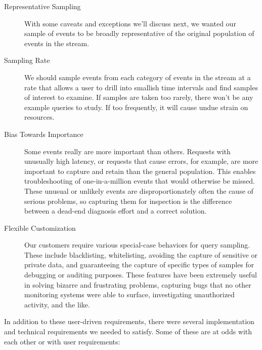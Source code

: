 \documentclass{vivid_layout}
\begin{document}
\begin{description}

\item[Representative Sampling] With some caveats and exceptions we'll discuss
next, we wanted our sample of events to be broadly representative of the
original population of events in the stream.

\item[Sampling Rate] We should sample events from each category of events in the
stream at a rate that allows a user to drill into smallish time intervals and
find samples of interest to examine. If samples are taken too rarely, there
won't be any example queries to study. If too frequently, it will cause undue
strain on resources.

\item[Bias Towards Importance] Some events really are more important than
others. Requests with unusually high latency, or requests that cause errors, for
example, are more important to capture and retain than the general population.
This enables troubleshooting of one-in-a-million events that would otherwise be
missed. These unusual or unlikely events are disproportionately often the cause
of serious problems, so capturing them for inspection is the difference between
a dead-end diagnosis effort and a correct solution.

\item[Flexible Customization] Our customers require various special-case
behaviors for query sampling. These include blacklisting, whitelisting, avoiding
the capture of sensitive or private data, and guaranteeing the capture of
specific types of samples for debugging or auditing purposes. These features
have been extremely useful in solving bizarre and frustrating problems,
capturing bugs that no other monitoring systems were able to surface,
investigating unauthorized activity, and the like.

\end{description}

In addition to these user-driven requirements, there were several implementation
and technical requirements we needed to satisfy. Some of these are at odds with
each other or with user requirements:
\end{document}
